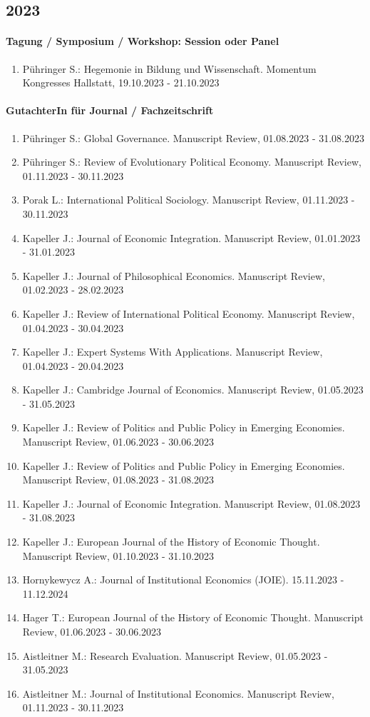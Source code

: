 \subsection*{2023} 
\paragraph{Tagung / Symposium / Workshop: Session oder Panel} 
\begin{enumerate}[leftmargin=*, labelsep=0.5cm] 
 	 \item Pühringer S.: Hegemonie in Bildung und Wissenschaft. Momentum Kongresses Hallstatt, 19.10.2023 - 21.10.2023 
\end{enumerate} 
\paragraph{GutachterIn für Journal / Fachzeitschrift} 
\begin{enumerate}[leftmargin=*, labelsep=0.5cm] 
 	 \item Pühringer S.: Global Governance. Manuscript Review, 01.08.2023 - 31.08.2023 
	 \item Pühringer S.: Review of Evolutionary Political Economy. Manuscript Review, 01.11.2023 - 30.11.2023 
	 \item Porak L.: International Political Sociology. Manuscript Review, 01.11.2023 - 30.11.2023 
	 \item Kapeller J.: Journal of Economic Integration. Manuscript Review, 01.01.2023 - 31.01.2023 
	 \item Kapeller J.: Journal of Philosophical Economics. Manuscript Review, 01.02.2023 - 28.02.2023 
	 \item Kapeller J.: Review of International Political Economy. Manuscript Review, 01.04.2023 - 30.04.2023 
	 \item Kapeller J.: Expert Systems With Applications. Manuscript Review, 01.04.2023 - 20.04.2023 
	 \item Kapeller J.: Cambridge Journal of Economics. Manuscript Review, 01.05.2023 - 31.05.2023 
	 \item Kapeller J.: Review of Politics and Public Policy in Emerging Economies. Manuscript Review, 01.06.2023 - 30.06.2023 
	 \item Kapeller J.: Review of Politics and Public Policy in Emerging Economies. Manuscript Review, 01.08.2023 - 31.08.2023 
	 \item Kapeller J.: Journal of Economic Integration. Manuscript Review, 01.08.2023 - 31.08.2023 
	 \item Kapeller J.: European Journal of the History of Economic Thought. Manuscript Review, 01.10.2023 - 31.10.2023 
	 \item Hornykewycz A.: Journal of Institutional Economics (JOIE). 15.11.2023 - 11.12.2024 
	 \item Hager T.: European Journal of the History of Economic Thought. Manuscript Review, 01.06.2023 - 30.06.2023 
	 \item Aistleitner M.: Research Evaluation. Manuscript Review, 01.05.2023 - 31.05.2023 
	 \item Aistleitner M.: Journal of Institutional Economics. Manuscript Review, 01.11.2023 - 30.11.2023 
\end{enumerate} 

